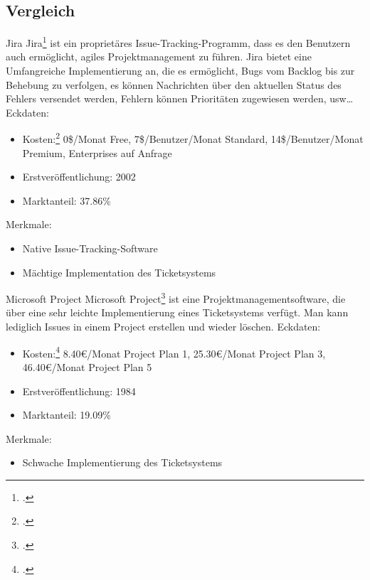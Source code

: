 \subsection{Vergleich}	
Jira
Jira\footcite{jira} ist ein proprietäres Issue-Tracking-Programm, dass es den Benutzern auch ermöglicht, agiles Projektmanagement zu führen. Jira bietet eine Umfangreiche Implementierung an, die es ermöglicht, Bugs vom Backlog bis zur Behebung zu verfolgen, es können Nachrichten über den aktuellen Status des Fehlers versendet werden, Fehlern können Prioritäten zugewiesen werden, usw…		
Eckdaten:
\begin{itemize}
	\item Kosten:\footcite{jira-pricing} 0\$/Monat Free, 7\$/Benutzer/Monat Standard, 14\$/Benutzer/Monat Premium, Enterprises auf Anfrage
	\item Erstveröffentlichung: 2002
	\item Marktanteil: 37.86\%
\end{itemize}				
Merkmale:
\begin{itemize}
	\item Native Issue-Tracking-Software
	\item Mächtige Implementation des Ticketsystems
\end{itemize}				
Microsoft Project			
Microsoft Project\footcite{microsoft-project} ist eine Projektmanagementsoftware, die über eine sehr leichte Implementierung eines Ticketsystems verfügt. Man kann lediglich Issues in einem Project erstellen und wieder löschen.
Eckdaten:
\begin{itemize}
	\item Kosten:\footcite{microsoft-project-pricing} 8.40€/Monat Project Plan 1, 25.30€/Monat Project Plan 3, 46.40€/Monat Project Plan 5
	\item Erstveröffentlichung: 1984
	\item Marktanteil: 19.09\%
\end{itemize}
Merkmale:
\begin{itemize}
	\item Schwache Implementierung des Ticketsystems
\end{itemize}				
